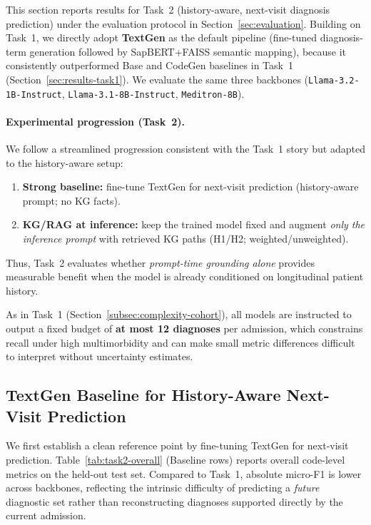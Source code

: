 This section reports results for Task~2 (history-aware, next-visit diagnosis prediction) under the evaluation protocol in Section~\ref{sec:evaluation}. Building on Task~1, we directly adopt \textbf{TextGen} as the default pipeline (fine-tuned diagnosis-term generation followed by SapBERT+FAISS semantic mapping), because it consistently outperformed Base and CodeGen baselines in Task~1 (Section~\ref{sec:results-task1}). We evaluate the same three backbones (\texttt{Llama-3.2-1B-Instruct}, \texttt{Llama-3.1-8B-Instruct}, \texttt{Meditron-8B}).

\paragraph{Experimental progression (Task~2).}
We follow a streamlined progression consistent with the Task~1 story but adapted to the history-aware setup:
\begin{enumerate}
    \item \textbf{Strong baseline:} fine-tune TextGen for next-visit prediction (history-aware prompt; no KG facts).
    \item \textbf{KG/RAG at inference:} keep the trained model fixed and augment \emph{only the inference prompt} with retrieved KG paths (H1/H2; weighted/unweighted).
\end{enumerate}
Thus, Task~2 evaluates whether \emph{prompt-time grounding alone} provides measurable benefit when the model is already conditioned on longitudinal patient history.

As in Task~1 (Section~\ref{subsec:complexity-cohort}), all models are instructed to output a fixed budget of \textbf{at most 12 diagnoses} per admission, which constrains recall under high multimorbidity and can make small metric differences difficult to interpret without uncertainty estimates.

\subsection{TextGen Baseline for History-Aware Next-Visit Prediction}
\label{subsec:results-task2-baseline}

We first establish a clean reference point by fine-tuning TextGen for next-visit prediction. Table~\ref{tab:task2-overall} (Baseline rows) reports overall code-level metrics on the held-out test set. Compared to Task~1, absolute micro-F1 is lower across backbones, reflecting the intrinsic difficulty of predicting a \emph{future} diagnostic set rather than reconstructing diagnoses supported directly by the current admission.

